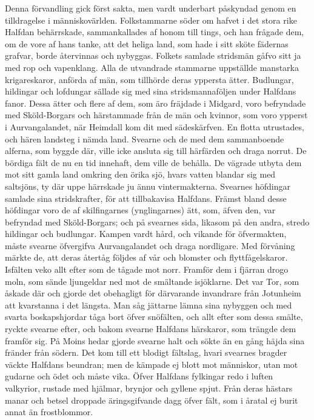 Denna förvandling gick först sakta, men vardt underbart påskyndad genom
en tilldragelse i människovärlden. Folkstammarne söder om hafvet i det
stora rike Halfdan behärrskade, sammankallades af honom till tings, och
han frågade dem, om de vore af hans tanke, att det heliga land, som hade
i sitt sköte fädernas grafvar, borde återvinnas och nybyggas. Folkets
samlade stridsmän gåfvo sitt ja med rop och vapenklang. Alla de
utvandrade stammarne uppställde manstarka krigareskaror, anförda af män,
som tillhörde deras yppersta ätter. Budlungar, hildingar och lofdungar
sällade sig med sina stridsmannaföljen under Halfdans fanor. Dessa ätter
och flere af dem, som äro fräjdade i Midgard, voro befryndade med
Sköld-Borgars och härstammade från de män och kvinnor, som voro ypperst
i Aurvangalandet, när Heimdall kom dit med sädeskärfven. En flotta
utrustades, och hären landsteg i nämda land. Svearne och de med dem
sammanboende alferna, som byggde där, ville icke ansluta sig till
härfärden och draga norrut. De bördiga fält de nu en tid innehaft, dem
ville de behålla. De vägrade utbyta dem mot sitt gamla land omkring den
örika sjö, hvars vatten blandar sig med saltsjöns, ty där uppe härrskade
ju ännu vintermakterna. Svearnes höfdingar samlade sina stridskrafter,
för att tillbakavisa Halfdans. Främst bland desse höfdingar voro de af
skilfingarnes (ynglingarnes) ätt, som, äfven den, var befryndad med
Sköld-Borgars; och på svearnes sida, likasom på den andra, stredo
hildingar och budlungar. Kampen vardt hård, och vikande för öfvermakten,
måste svearne öfvergifva Aurvangalandet och draga nordligare. Med
förvåning märkte de, att deras återtåg följdes af vår och blomster och
flyttfågelskaror. Isfälten veko allt efter som de tågade mot norr.
\protect\hypertarget{lb1625905.xhtmlux5cux23start115}{}{}\protect\hypertarget{lb1625905.xhtmlux5cux23start115-a}{}{}\protect\hypertarget{lb1625905.xhtmlux5cux23start115-b}{}{}\protect\hypertarget{lb1625905.xhtmlux5cux23start115-c}{}{}\protect\hypertarget{lb1625905.xhtmlux5cux23start115-d}{}{}
Framför dem i fjärran drogo moln, som sände ljungeldar ned mot de
smältande isjöklarne. Det var Tor, som åskade där och gjorde det
obehagligt för därvarande invandrare från Jotunheim att kvarstanna i det
längsta. Man såg jättarne lämna sina nybyggen och med svarta
boskapshjordar tåga bort öfver snöfälten, och allt efter som dessa
smälte, ryckte svearne efter, och bakom svearne Halfdans härskaror, som
trängde dem framför sig. På Moins hedar gjorde svearne halt och sökte än
en gång häjda sina fränder från södern. Det kom till ett blodigt
fältslag, hvari svearnes bragder väckte Halfdans beundran; men de
kämpade ej blott mot människor, utan mot gudarne och ödet och måste
vika. Öfver Halfdans fylkingar redo i luften valkyrior, rustade med
hjälmar, brynjor och gyllene spjut. Från deras hästars manar och betsel
droppade äringsgifvande dagg öfver fält, som i åratal ej burit annat än
frostblommor.

